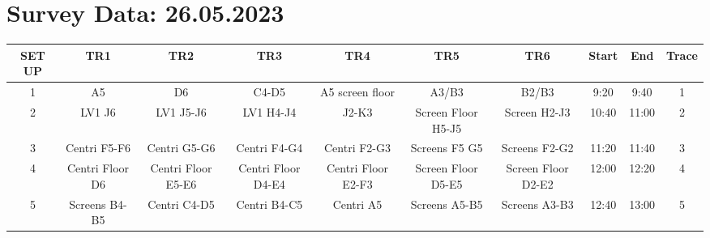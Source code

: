 \documentclass[8pt]{article}
\begin{document}
\section*{Survey Data: 26.05.2023}
\begin{tabular}{|c|c|c|c|c|c|c|c|c|c|}
\hline
SET UP & TR1 & TR2 & TR3 & TR4 & TR5 & TR6 & Start & End & Trace\\
\hline
1 & A5 & D6 & C4-D5 & A5 screen floor & A3/B3 & B2/B3 & 9:20 & 9:40 & 1\\
2 & LV1 J6 & LV1 J5-J6 & LV1 H4-J4 & J2-K3 & Screen Floor H5-J5 & Screen H2-J3 & 10:40 & 11:00 & 2\\
3 & Centri F5-F6 & Centri G5-G6 & Centri F4-G4 & Centri F2-G3 & Screens F5 G5 & Screens F2-G2 & 11:20 & 11:40 & 3\\
4 & Centri Floor D6 & Centri Floor E5-E6 & Centri Floor D4-E4 & Centri Floor E2-F3 & Screen Floor D5-E5 & Screen Floor D2-E2 & 12:00 & 12:20 & 4\\
5 & Screens B4-B5 & Centri C4-D5 & Centri B4-C5 & Centri A5 & Screens A5-B5 & Screens A3-B3 & 12:40 & 13:00 & 5\\
\hline
\end{tabular}
\end{document}
